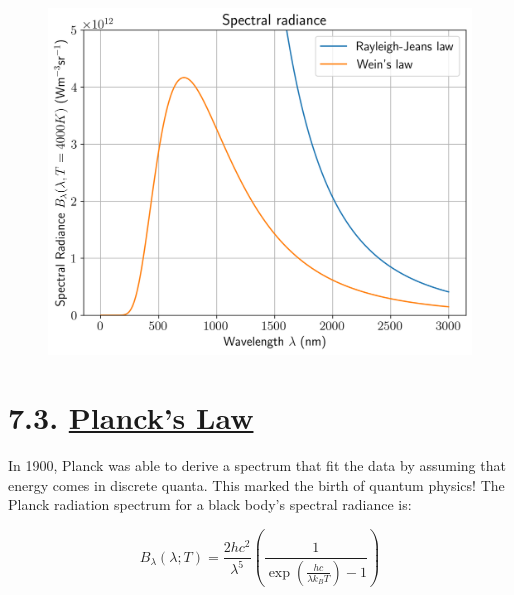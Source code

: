 \documentclass[
  letterpaper,
  DIV=11,
  numbers=noendperiod]{scrreprt}
\begin{document}
\begin{figure}[H]

{\centering \includegraphics{SP1.1_-_Stellar_Properties_files/figure-pdf/cell-20-output-1.png}

}

\end{figure}

\hypertarget{plancks-law}{%
\section{\texorpdfstring{7.3. \protect\hyperlink{toc0_}{Planck's
Law}}{7.3. Planck's Law}}\label{plancks-law}}

In 1900, Planck was able to derive a spectrum that fit the data by
assuming that energy comes in discrete quanta. This marked the birth of
quantum physics! The Planck radiation spectrum for a black body's
spectral radiance is:

\begin{equation}
B_\lambda(\lambda; T) = \frac{2 hc^2}{\lambda^5}\left(\frac{1}{\exp\left(\frac{hc}{\lambda k_B T}\right) -1} \right)
\end{equation}
\end{document}
